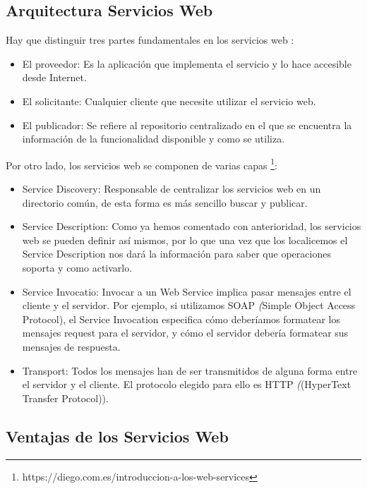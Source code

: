 \subsection{Arquitectura Servicios Web}
\label{cap:subsec:arquitecturaserviciosweb}

Hay que distinguir tres partes fundamentales en los servicios web \citep{TorresJoaquin2017SC}:
\begin{itemize}
	\item El proveedor: Es la aplicación que implementa el servicio y lo hace accesible desde Internet.
	\item El solicitante: Cualquier cliente que necesite utilizar el servicio web.
	\item El publicador: Se refiere al repositorio centralizado en el que se encuentra la información de la funcionalidad disponible y como se utiliza.
	
\end{itemize}
Por otro lado, los servicios web se componen de varias capas \footnote{https://diego.com.es/introduccion-a-los-web-services}:
\begin{itemize}
	\item Service Discovery: Responsable de centralizar los servicios web en un directorio común, de esta forma es más sencillo buscar y publicar.
	\item Service Description: Como ya hemos comentado con anterioridad, los servicios web se pueden definir así mismos, por lo que una vez que los localicemos el Service Description nos dará la información para saber que operaciones soporta y como activarlo.
	\item Service Invocatio: Invocar a un Web Service implica pasar mensajes entre el cliente y el servidor. Por ejemplo, si utilizamos SOAP  \textit({Simple Object Access Protocol}), el Service Invocation especifica cómo deberíamos formatear los mensajes request para el servidor, y cómo el servidor debería formatear sus mensajes de respuesta.
	\item Transport: Todos los mensajes han de ser transmitidos de alguna forma entre el servidor y el cliente. El protocolo elegido para ello es HTTP  \textit({(HyperText Transfer Protocol)}). 
\end{itemize}



\subsection{Ventajas de los  Servicios Web}
\label{cap:subsec:ventajasserviciosweb}

